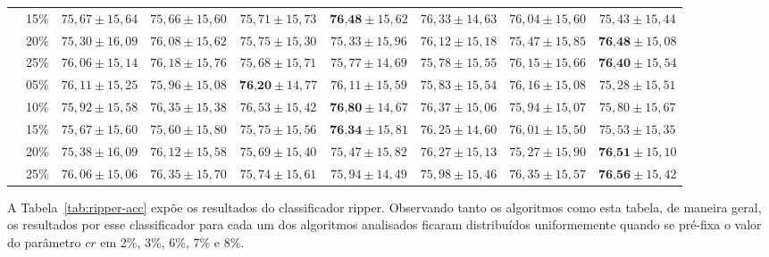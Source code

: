\begin{table}[h]
{\begin{tabular}{|c|c|c|c|c|c|c|c|c|}
                 & 15\% & $75,67 \pm 15,64$ & $75,66 \pm 15,60$ & $75,71 \pm 15,73$ & $\textbf{76,48} \pm 15,62$ & $76,33 \pm 14,63$ & $76,04 \pm 15,60$ & $75,43 \pm 15,44$ \\ \cline{2-9}
                 & 20\% & $75,30 \pm 16,09$ & $76,08 \pm 15,62$ & $75,75 \pm 15,30$ & $75,33 \pm 15,96$ & $76,12 \pm 15,18$ & $75,47 \pm 15,85$ & $\textbf{76,48} \pm 15,08$ \\ \cline{2-9}
                 & 25\% & $76,06 \pm 15,14$ & $76,18 \pm 15,76$ & $75,68 \pm 15,71$ & $75,77 \pm 14,69$ & $75,78 \pm 15,55$ & $76,15 \pm 15,66$ & $\textbf{76,40} \pm 15,54$ \\ \hline
                \parbox[t]{3mm}{}
                 & 05\% & $76,11 \pm 15,25$ & $75,96 \pm 15,08$ & $\textbf{76,20} \pm 14,77$ & $76,11 \pm 15,59$ & $75,83 \pm 15,54$ & $76,16 \pm 15,08$ & $75,28 \pm 15,51$ \\ 
                 & 10\% & $75,92 \pm 15,58$ & $76,35 \pm 15,38$ & $76,53 \pm 15,42$ & $\textbf{76,80} \pm 14,67$ & $76,37 \pm 15,06$ & $75,94 \pm 15,07$ & $75,80 \pm 15,67$ \\ 
                 & 15\% & $75,67 \pm 15,60$ & $75,60 \pm 15,80$ & $75,75 \pm 15,56$ & $\textbf{76,34} \pm 15,81$ & $76,25 \pm 14,60$ & $76,01 \pm 15,50$ & $75,53 \pm 15,35$ \\ 
                 & 20\% & $75,38 \pm 16,09$ & $76,12 \pm 15,58$ & $75,69 \pm 15,40$ & $75,47 \pm 15,82$ & $76,27 \pm 15,13$ & $75,27 \pm 15,90$ & $\textbf{76,51} \pm 15,10$ \\ 
                 & 25\% & $76,06 \pm 15,06$ & $76,35 \pm 15,70$ & $75,74 \pm 15,61$ & $75,94 \pm 14,49$ & $75,98 \pm 15,46$ & $76,35 \pm 15,57$ & $\textbf{76,56} \pm 15,42$ \\ \hline
            \end{tabular}%
        }
        \label{tab:rpart-acc}
    \end{table}
    
    A Tabela~\ref{tab:ripper-acc} expõe os resultados do classificador \ac{ripper}. Observando tanto os algoritmos como esta tabela, de maneira geral, os resultados por esse classificador para cada um dos algoritmos analisados ficaram distribuídos uniformemente quando se pré\hyp{fixa} o valor do parâmetro $cr$ em 2\%, 3\%, 6\%, 7\% e 8\%.
    
